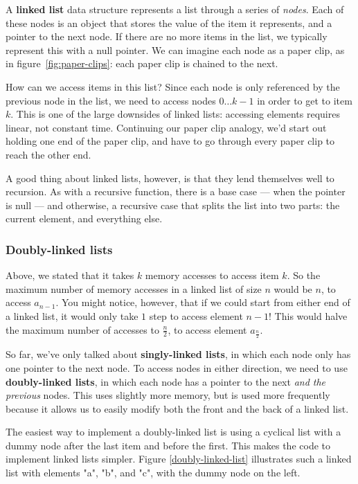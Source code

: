 A \textbf{linked list} data structure represents a list through a series of \textit{nodes}. Each of these nodes is an object that stores the value of the item it represents, and a pointer to the next node. If there are no more items in the list, we typically represent this with a null pointer. We can imagine each node as a paper clip, as in figure~\ref{fig:paper-clips}: each paper clip is chained to the next.

How can we access items in this list? Since each node is only referenced by the previous node in the list, we need to access nodes $0 \dots k-1$ in order to get to item $k$. This is one of the large downsides of linked lists: accessing elements requires linear, not constant time. Continuing our paper clip analogy, we'd start out holding one end of the paper clip, and have to go through every paper clip to reach the other end.

A good thing about linked lists, however, is that they lend themselves well to recursion. As with a recursive function, there is a base case --- when the pointer is null --- and otherwise, a recursive case that splits the list into two parts: the current element, and everything else.

\subsubsection{Doubly-linked lists}

Above, we stated that it takes $k$ memory accesses to access item $k$. So the maximum number of memory accesses in a linked list of size $n$ would be $n$, to access $a_{n-1}$. You might notice, however, that if we could start from either end of a linked list, it would only take $1$ step to access element $n-1$! This would halve the maximum number of accesses to $\frac{n}{2}$, to access element $a_\frac{n}{2}$.

So far, we've only talked about \textbf{singly-linked lists}, in which each node only has one pointer to the next node. To access nodes in either direction, we need to use \textbf{doubly-linked lists}, in which each node has a pointer to the next \textit{and the previous} nodes. This uses slightly more memory, but is used more frequently because it allows us to easily modify both the front and the back of a linked list.

The easiest way to implement a doubly-linked list is using a cyclical list with a dummy node after the last item and before the first. This makes the code to implement linked lists simpler. Figure \ref{doubly-linked-list} illustrates such a linked list with elements "a", "b", and "c", with the dummy node on the left.

